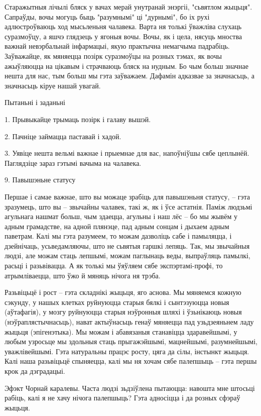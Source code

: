 Старажытныя лічылі бляск у вачах мерай унутранай энэргіі, "сьвятлом жыцьця". Сапраўды, вочы могуць быць "разумнымі" ці "дурнымі", бо іх рухі адлюстроўваюць ход мысьленьня чалавека. Варта ня толькі ўважліва слухаць суразмоўцу, а яшчэ глядзець у ягоныя вочы. Вочы, як і цела, нясуць мноства важнай невэрбальнай інфармацыі, якую практычна немагчыма падрабіць. Заўважайце, як мяняецца позірк суразмоўцы на розных тэмах, як вочы ажыўляюцца на цікавым і страчваюць бляск на нудным. Бо чым больш значнае нешта для нас, тым больш мы гэта заўважаем. Дафамін адказвае за значнасьць, а значнасьць кіруе нашай увагай.

Пытаньні і заданьні

1. Прывыкайце трымаць позірк і галаву вышэй.

2. Пачніце займацца паставай і хадой.

3. Уявіце нешта вельмі важнае і прыемнае для вас, напоўніўшы сябе цеплынёй. Паглядзіце зараз гэтымі вачыма на чалавека.


9. Павышэньне статусу

Першае і самае важнае, што вы можаце зрабіць для павышэньня статусу, – гэта зразумець, што вы – звычайны чалавек, такі ж, як і ўсе астатнія. Паміж людзьмі агульнага нашмат больш, чым здаецца, агульны і наш лёс – бо мы жывём у адным грамадстве, на адной плянэце, пад адным сонцам і дыхаем адным паветрам. Калі мы гэта разумеем, то можам дазволіць сабе і памыляцца, і дзейнічаць, усьведамляючы, што не сьвятыя гаршкі лепяць. Так, мы звычайныя людзі, але можам стаць лепшымі, можам паглынаць веды, выпраўляць памылкі, расьці і разьвівацца. А як толькі мы ўяўляем сябе экспэртамі-профі, то атрымліваецца, што ўжо й мяняць нічога ня трэба.

Разьвіцьцё і рост – гэта складнікі жыцьця, яго аснова. Мы мяняемся кожную сэкунду, у нашых клетках руйнуюцца старыя бялкі і сынтэзуюцца новыя (аўтафагія), у мозгу руйнуюцца старыя нэўронныя шляхі і ўзьнікаюць новыя (нэўраплястычнасьць), нават актыўнасьць генаў мяняецца пад узьдзеяньнем ладу жыцьця (эпігенэтыка). Мы можам і абавязаныя станавіцца здаравейшымі, у любым узросьце мы здольныя стаць прыгажэйшымі, мацнейшымі, разумнейшымі, уважлівейшымі. Гэта натуральны працэс росту, цяга да сілы, інстынкт жыцьця. Калі наша разьвіцьцё спыняецца, калі мы ня хочам сябе палепшыць – гэта першы крок да дэградацыі.

Эфэкт Чорнай каралевы. Часта людзі зьдзіўлена пытаюцца: навошта мне штосьці рабіць, калі я не хачу нічога палепшыць? Гэта адносіцца і да розных сфэраў жыцьця. 

